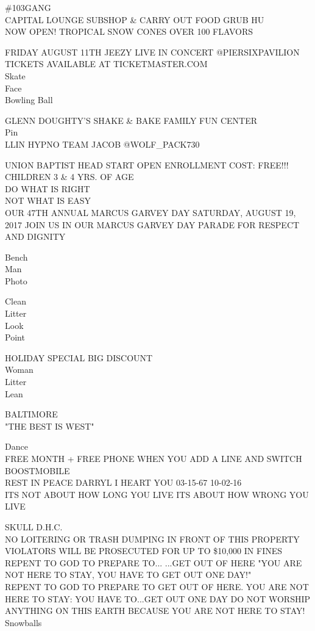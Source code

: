 \documentclass[10pt,letterpaper]{article}
\begin{document}
\#103GANG\\
CAPITAL LOUNGE SUBSHOP \& CARRY OUT FOOD GRUB HU\\
NOW OPEN!  TROPICAL SNOW CONES OVER 100 FLAVORS

FRIDAY AUGUST 11TH JEEZY LIVE IN CONCERT @PIERSIXPAVILION TICKETS AVAILABLE AT TICKETMASTER.COM\\
Skate\\
Face\\
Bowling Ball

GLENN DOUGHTY'S SHAKE \& BAKE FAMILY FUN CENTER\\
Pin\\
LLIN HYPNO TEAM JACOB @WOLF\_PACK730

UNION BAPTIST HEAD START OPEN ENROLLMENT COST: FREE!!! CHILDREN 3 \& 4 YRS. OF AGE\\
DO WHAT IS RIGHT\\
NOT WHAT IS EASY\\
OUR 47TH ANNUAL MARCUS GARVEY DAY SATURDAY, AUGUST 19, 2017 JOIN US IN OUR MARCUS GARVEY DAY PARADE FOR RESPECT AND DIGNITY

Bench\\
Man\\
Photo

Clean\\
Litter\\
Look\\
Point

HOLIDAY SPECIAL BIG DISCOUNT\\
Woman\\
Litter\\
Lean

BALTIMORE\\
"THE BEST IS WEST"

Dance\\
FREE MONTH + FREE PHONE WHEN YOU ADD A LINE AND SWITCH BOOSTMOBILE\\
REST IN PEACE DARRYL I HEART YOU 03{-}15{-}67 10{-}02{-}16\\
ITS NOT ABOUT HOW LONG YOU LIVE ITS ABOUT HOW WRONG YOU LIVE

SKULL D.H.C.\\
NO LOITERING OR TRASH DUMPING IN FRONT OF THIS PROPERTY VIOLATORS WILL BE PROSECUTED FOR UP TO \$10,000 IN FINES REPENT TO GOD TO PREPARE TO... ...GET OUT OF HERE "YOU ARE NOT HERE TO STAY, YOU HAVE TO GET OUT ONE DAY!"\\
REPENT TO GOD TO PREPARE TO GET OUT OF HERE.  YOU ARE NOT HERE TO STAY: YOU HAVE TO...GET OUT ONE DAY DO NOT WORSHIP ANYTHING ON THIS EARTH BECAUSE YOU ARE NOT HERE TO STAY!\\
Snowballs
\end{document}
